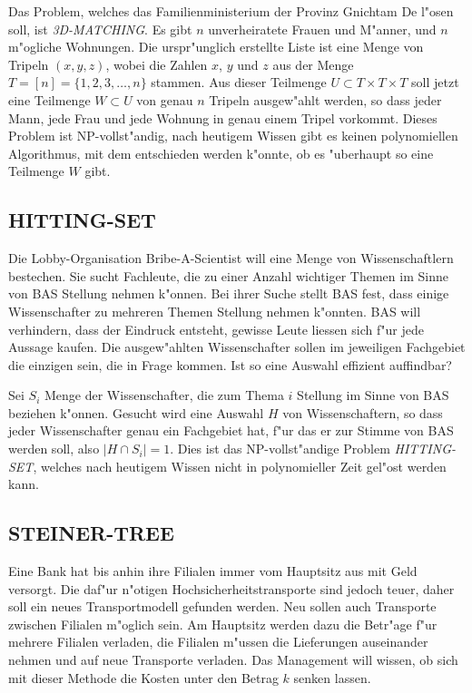 \medskip

Das Problem, welches das Familienministerium der Provinz Gnichtam De
l"osen soll, ist {\it 3D-MATCHING}. Es gibt $n$ unverheiratete Frauen
und M"anner, und $n$ m"ogliche Wohnungen. Die urspr"unglich erstellte
Liste ist eine Menge von Tripeln $(x,y,z)$, wobei die Zahlen $x$,
$y$ und $z$ aus der Menge $T=[n]=\{1,2,3,\dots,n\}$ stammen. Aus dieser
Teilmenge $U\subset T\times T\times T$ soll jetzt eine 
Teilmenge $W\subset U$ von genau $n$ Tripeln ausgew"ahlt werden, so dass
jeder Mann, jede Frau und jede Wohnung in genau einem Tripel vorkommt.
Dieses Problem ist NP-vollst"andig, 
nach heutigem Wissen gibt es keinen polynomiellen Algorithmus,
mit dem entschieden werden k"onnte, ob es "uberhaupt so eine Teilmenge
$W$ gibt.

\subsection{HITTING-SET}
Die Lobby-Organisation Bribe-A-Scientist will eine Menge von
Wissenschaftlern bestechen.
Sie sucht Fachleute, die zu einer Anzahl wichtiger Themen
im Sinne von BAS Stellung nehmen k"onnen.
Bei ihrer Suche stellt BAS fest, dass einige Wissenschafter
zu mehreren Themen Stellung nehmen k"onnten.
BAS will verhindern, dass der Eindruck entsteht, gewisse
Leute liessen sich f"ur jede Aussage kaufen.
Die ausgew"ahlten Wissenschafter sollen im jeweiligen Fachgebiet
die einzigen sein, die in Frage kommen.
Ist so eine Auswahl effizient auffindbar?

\medskip

Sei $S_i$ Menge der Wissenschafter, die zum Thema $i$ Stellung im
Sinne von BAS beziehen k"onnen. Gesucht wird eine Auswahl
$H$ von Wissenschaftern, so dass jeder Wissenschafter genau
ein Fachgebiet hat, f"ur das er zur Stimme von BAS werden soll,
also $|H\cap S_i|=1$.
Dies ist das NP-vollst"andige Problem {\it HITTING-SET}, welches
nach heutigem Wissen nicht in polynomieller Zeit gel"ost werden
kann.


\subsection{STEINER-TREE}
Eine Bank hat bis anhin ihre Filialen immer vom Hauptsitz aus mit
Geld versorgt. Die daf"ur n"otigen Hochsicherheitstransporte sind
jedoch teuer, daher soll ein neues Transportmodell gefunden werden.
Neu sollen auch Transporte zwischen Filialen m"oglich sein.
Am Hauptsitz werden dazu die Betr"age f"ur mehrere Filialen
verladen, die Filialen m"ussen die Lieferungen
auseinander nehmen und auf neue Transporte verladen. Das
Management will wissen, ob sich mit dieser Methode die
Kosten unter den Betrag $k$ senken lassen. 


